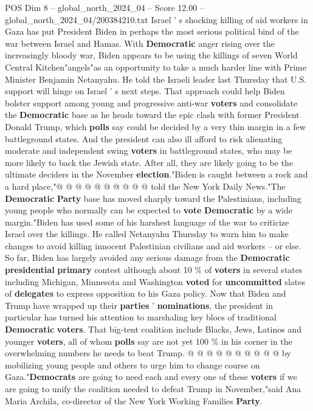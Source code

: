 \begin{textsample}{POS Dim 8 – global\_north\_2024\_04 – Score 12.00 – global\_north\_2024\_04/200384210.txt}  \label{ex:f8_pos_058}
Israel ' s shocking killing of aid workers in Gaza has put President Biden in perhaps the most serious political bind of the war between Israel and Hamas.
With \textbf{Democratic} anger rising over the increasingly bloody war, Biden appears to be using the killings of seven World Central Kitchen"angels"as an opportunity to take a much harder line with Prime Minister Benjamin Netanyahu.
He told the Israeli leader last Thursday that U.S. support will hinge on Israel ' s next steps.
That approach could help Biden bolster support among young and progressive anti-war \textbf{voters} and consolidate the \textbf{Democratic} base as he heads toward the epic clash with former President Donald Trump, which \textbf{polls} say could be decided by a very thin margin in a few battleground states.
And the president can also ill afford to risk alienating moderate and independent swing \textbf{voters} in battleground states, who may be more likely to back the Jewish state.
After all, they are likely going to be the ultimate deciders in the November \textbf{election}."Biden is caught between a rock and a hard place,"@ @ @ @ @ @ @ @ @ @ told the New York Daily News."The \textbf{Democratic} \textbf{Party} base has moved sharply toward the Palestinians, including young people who normally can be expected to \textbf{vote} \textbf{Democratic} by a wide margin."Biden has used some of his harshest language of the war to criticize Israel over the killings.
He called Netanyahu Thursday to warn him to make changes to avoid killing innocent Palestinian civilians and aid workers -- or else.
So far, Biden has largely avoided any serious damage from the \textbf{Democratic} \textbf{presidential} \textbf{primary} contest although about 10 \% of \textbf{voters} in several states including Michigan, Minnesota and Washington \textbf{voted} for \textbf{uncommitted} slates of \textbf{delegates} to express opposition to his Gaza policy.
Now that Biden and Trump have wrapped up their \textbf{parties} ' \textbf{nominations}, the president in particular has turned his attention to marshaling key blocs of traditional \textbf{Democratic} \textbf{voters}.
That big-tent coalition include Blacks, Jews, Latinos and younger \textbf{voters}, all of whom \textbf{polls} say are not yet 100 \% in his corner in the overwhelming numbers he needs to beat Trump. @ @ @ @ @ @ @ @ @ @ by mobilizing young people and others to urge him to change course on Gaza."\textbf{Democrats} are going to need each and every one of these \textbf{voters} if we are going to unify the coalition needed to defeat Trump in November,"said Ana Maria Archila, co-director of the New York Working Families \textbf{Party}.

\end{textsample}
